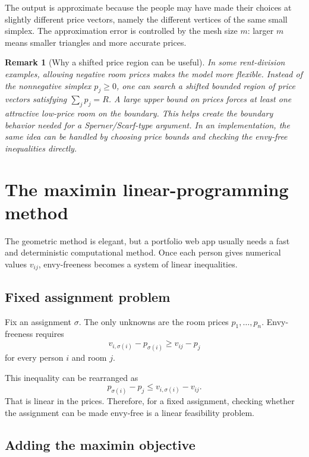 \documentclass[11pt]{article}
\newtheorem{remark}{Remark}
\begin{document}
The output is approximate because the people may have made their choices at slightly different price vectors, namely the different vertices of the same small simplex. The approximation error is controlled by the mesh size $m$: larger $m$ means smaller triangles and more accurate prices.

\begin{remark}[Why a shifted price region can be useful]
In some rent-division examples, allowing negative room prices makes the model more flexible. Instead of the nonnegative simplex $p_j\geq 0$, one can search a shifted bounded region of price vectors satisfying $\sum_j p_j=R$. A large upper bound on prices forces at least one attractive low-price room on the boundary. This helps create the boundary behavior needed for a Sperner/Scarf-type argument. In an implementation, the same idea can be handled by choosing price bounds and checking the envy-free inequalities directly.
\end{remark}

\section{The maximin linear-programming method}

The geometric method is elegant, but a portfolio web app usually needs a fast and deterministic computational method. Once each person gives numerical values $v_{ij}$, envy-freeness becomes a system of linear inequalities.

\subsection{Fixed assignment problem}

Fix an assignment $\sigma$. The only unknowns are the room prices $p_1,\dots,p_n$. Envy-freeness requires
\[
    v_{i,\sigma(i)}-p_{\sigma(i)}\geq v_{ij}-p_j
\]
for every person $i$ and room $j$.

This inequality can be rearranged as
\begin{equation}
    p_{\sigma(i)}-p_j\leq v_{i,\sigma(i)}-v_{ij}.
    \label{eq:linearenvy}
\end{equation}
That is linear in the prices. Therefore, for a fixed assignment, checking whether the assignment can be made envy-free is a linear feasibility problem.

\subsection{Adding the maximin objective}
\end{document}
